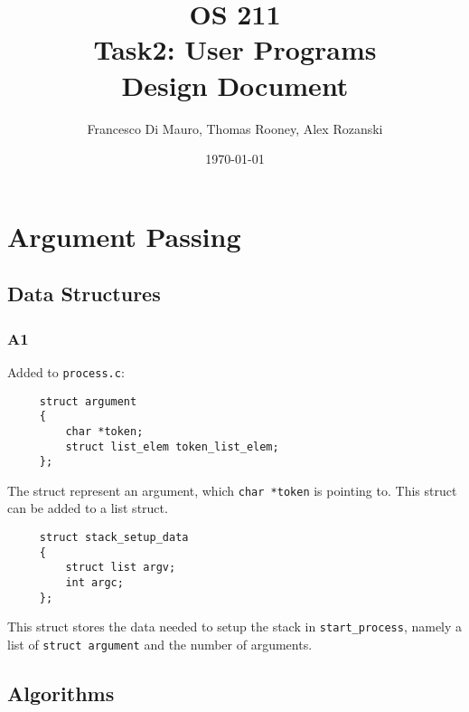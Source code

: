 \documentclass[a4wide, 11pt]{article}
\newcommand{\tab}{\hspace*{2em}}
\newcommand{\tx}{\texttt}
\begin{document}
\title{OS 211 \\ Task2: User Programs \\ Design Document}
\author{Francesco Di Mauro, Thomas Rooney, Alex Rozanski}
\date{\today}
\maketitle

\section{Argument Passing}
\subsection{Data Structures}
\subsubsection{A1}
Added to \tx{process.c}:
\tab \begin{verbatim}
     struct argument
     {
         char *token;
         struct list_elem token_list_elem;
     };
\end{verbatim}
\tab The struct represent an argument, which \tx{char *token} is pointing to. This struct can be added to a list struct.
\\
\tab \begin{verbatim}
     struct stack_setup_data
     {
         struct list argv;
         int argc;
     };
\end{verbatim}
This struct stores the data needed to setup the stack in \tx{start\_process}, namely a list of \tx{struct argument} and the number of arguments. 

\subsection{Algorithms}
\end{document}
